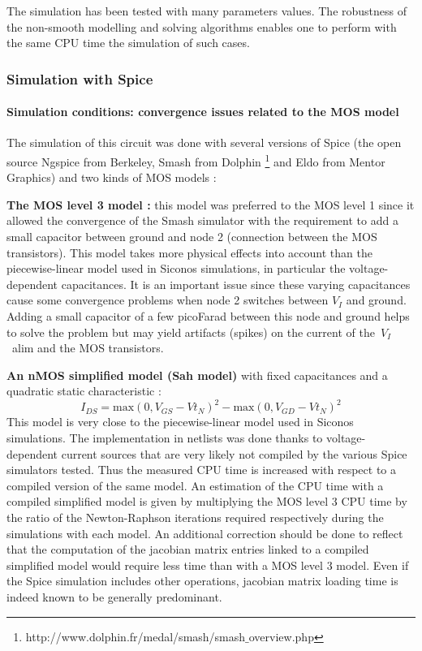 The simulation has been tested with many parameters values. The robustness of the non-smooth
modelling and solving algorithms enables one to perform with the same CPU time the simulation of such cases.  



\subsubsection{Simulation with {\sc Spice} }

\paragraph{Simulation conditions: convergence issues related to the MOS model}
The simulation of this circuit was done with several versions of {\sc Spice} (the open source {\sc Ngspice} from
Berkeley, {\sc Smash} from Dolphin \footnote{http://www.dolphin.fr/medal/smash/smash$\_$overview.php} and
{\sc Eldo} from Mentor Graphics) and two kinds of MOS models :
\begin{description}
\item \textbf{The MOS level 3 model :} this model was preferred to the MOS level 1 since it allowed the convergence
of the {\sc Smash} simulator with the requirement to add a small capacitor between ground and node 2 (connection between
the MOS transistors). This model takes more physical effects into account than the piecewise-linear model used in {\sc Siconos} simulations,
in particular the voltage-dependent capacitances. It is an important issue since these varying capacitances
cause some convergence problems when node 2 switches between $V_I$ and ground.
Adding a small capacitor of a few picoFarad between this node and ground helps to solve the problem
but may yield artifacts (spikes) on the current of the~$V_I$~alim and the MOS transistors.
\item\textbf{An nMOS simplified model (Sah model)} with fixed capacitances and a quadratic static characteristic :
\[
I_{DS} = \textrm{max}(0,V_{GS}-Vt_N)^2 - \textrm{max}(0,V_{GD}-Vt_N)^2 
\]
This model is very close to the piecewise-linear model used in {\sc Siconos} simulations. The implementation in netlists was done thanks to 
voltage-dependent current sources that are very likely not compiled by the various {\sc Spice} simulators tested.
Thus the measured CPU time is increased with respect to a compiled version of the same model.
An estimation of the CPU time with a compiled simplified model is given by multiplying the MOS level 3 CPU time
by the ratio of the Newton-Raphson iterations required respectively during the simulations with each model.
An additional correction should be done to reflect that the computation of the jacobian matrix entries
linked to a compiled simplified model would require less time than with a MOS level 3 model. Even if the {\sc Spice} simulation
includes other operations, jacobian matrix loading time is indeed known to be generally predominant.
\end{description}


